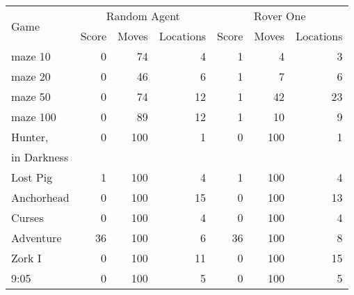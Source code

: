 \begin{tabular}{l|rrr|rrr}
\toprule
\multirow{2}{*}{Game} & \multicolumn{3}{c}{Random Agent} & \multicolumn{3}{c}{Rover One}\\
\cmidrule{2-7}
& Score & Moves & Locations & Score & Moves & Locations \\
\midrule
maze 10 & 0 & 74 & 4 & 1 & 4 & 3\\
maze 20 & 0 & 46 & 6 & 1 & 7 & 6\\
maze 50 & 0 & 74 & 12 & 1 & 42 & 23\\
maze 100 & 0 & 89 & 12 & 1 & 10 & 9\\
Hunter, & 0 & 100 & 1 & 0 & 100 & 1\\
in Darkness &&&&&& \\
Lost Pig & 1 & 100 & 4 & 1 & 100 & 4\\
Anchorhead & 0 & 100 & 15 & 0 & 100 & 13\\
Curses & 0 & 100 & 4 & 0 & 100 & 4\\
Adventure & 36 & 100 & 6 & 36 & 100 & 8\\
Zork I & 0 & 100 & 11 & 0 & 100 & 15\\
9:05 & 0 & 100 & 5 & 0 & 100 & 5 \\
\bottomrule
\end{tabular}
